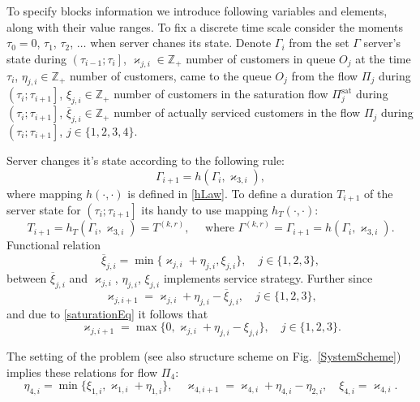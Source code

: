 \documentclass[10pt]{article}
\begin{document}
To specify blocks information we introduce following variables and elements, along with their value ranges. To fix a discrete time scale consider the moments $\tau_0=0$, $\tau_1$, $\tau_2$, $\ldots$ when server chanes its state. Denote $\Gamma_i$ from the set $\Gamma$ server's state during $\left(\tau_{i-1};\tau_i\right]$, $\varkappa_{j,i} \in \mathbb{Z}_+ $ number of customers in queue $O_j$ at the time $\tau_i$, $\eta_{j,i} \in \mathbb{Z}_+$ number of customers, came to the queue $O_j$ from the flow $\Pi_j$ during $\left(\tau_{i};\tau_{i+1}\right]$, $\xi_{j,i} \in \mathbb{Z}_+$ number of customers in the saturation flow $\Pi^{\mathrm{\text{sat}}}_j$ during $\left(\tau_{i};\tau_{i+1}\right]$, $\overline{\xi}_{j,i}\in \mathbb{Z}_+$ number of actually serviced customers in the flow $\Pi_j$ during $\left(\tau_{i};\tau_{i+1}\right]$, $j\in \{1,2,3,4\}$.

Server changes it's state according to the following rule:
\begin{equation}
\Gamma_{i+1}=h(\Gamma_i,\varkappa_{3,i}),
\label{gammaFunc}
\end{equation}
where mapping $h(\cdot,\cdot)$ is defined in \eqref{hLaw}.
To define a duration $T_{i+1}$ of the server state for $\left(\tau_{i};\tau_{i+1}\right]$ its handy to use mapping $h_T(\cdot,\cdot)$:
\begin{equation*}
T_{i+1}=h_T(\Gamma_i,\varkappa_{3,i})= T^{(k,r)},\quad  \text{ where } \Gamma^{(k,r)}=\Gamma_{i+1}=h(\Gamma_i,\varkappa_{3,i}).
\end{equation*}
Functional relation
\begin{equation}
\overline{\xi}_{j,i}=\min\{\varkappa_{j,i}+\eta_{j,i},\xi_{j,i}\}, \quad j\in \{1,2,3\},
\label{saturationEq}
\end{equation}
between $\overline{\xi}_{j,i}$ and $\varkappa_{j,i}$, $\eta_{j,i}$, $\xi_{j,i}$ implements service strategy. Further since
\begin{equation*}
\varkappa_{j,i+1}=\varkappa_{j,i}+\eta_{j,i}-\overline{\xi}_{j,i}, \quad  j\in \{1,2,3\},
\end{equation*}
and due to \eqref{saturationEq} it follows that 
\begin{equation}
\varkappa_{j,i+1}=\max\{{0,\varkappa_{j,i}+\eta_{j,i}-\xi_{j,i}}\}, \quad j\in \{1,2,3\}.
\label{queuesFunc}
\end{equation}

The setting of the problem (see also structure scheme on Fig.~\ref{SystemScheme}) implies these relations for flow $\Pi_4$:
\begin{equation}
\eta_{4,i} = \min\{\xi_{1,i}, \varkappa_{1,i}+\eta_{1,i}\}, \quad \varkappa_{4,i+1}=\varkappa_{4,i}+\eta_{4,i}-\eta_{2,i}, \quad \xi_{4,i} = \varkappa_{4,i}.
\label{FourthFunc}
\end{equation}
\end{document}
